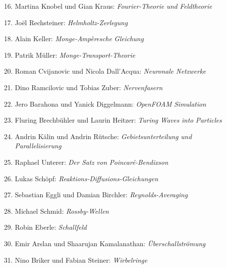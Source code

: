 \documentclass[handout]{beamer}
\begin{document}
\begin{frame}
\begin{columns}[t,onlytextwidth]
\begin{column}{0.60\textwidth}
\begin{description}
\begin{enumerate}
\setcounter{enumi}{15}
\item Martina Knobel und Gian Kraus: {\em Fourier-Theorie und Feldtheorie}
\item Joël Rechsteiner: {\em Helmholtz-Zerlegung}
\item Alain Keller: {\em Monge-Ampèresche Gleichung}
\item Patrik Müller: {\em Monge-Transport-Theorie}
\item Roman Cvijanovic und Nicola Dall'Acqua: {\em 
Neuronale Netzwerke}
\item Dino Ramcilovic und Tobias Zuber: {\em Nervenfasern}
\item Jero Barahona und Yanick Diggelmann: {\em OpenFOAM Simulation}
\item Fluring Brechbühler und Laurin Heitzer: {\em Turing Waves into Particles}
\item Andrin Kälin und Andrin Rütsche: {\em Gebietsunterteilung und
Parallelisierung}
\item Raphael Unterer: {\em Der Satz von Poincaré-Bendixson}
\item Lukas Schöpf: {\em Reaktions-Diffusions-Gleichungen}
\item Sebastian Eggli und Damian Birchler: {\em Reynolds-Averaging}
\item Michael Schmid: {\em Rossby-Wellen}
\item Robin Eberle: {\em Schallfeld}
\item Emir Arslan und Shaarujan Kamalanathan: {\em Überschallströmung}
\item Nino Briker und Fabian Steiner: {\em Wirbelringe}
\end{enumerate}
\end{description}
\end{column}
\begin{column}{0.01\textwidth}
\end{column}
\end{columns}
\end{frame}
\end{document}

